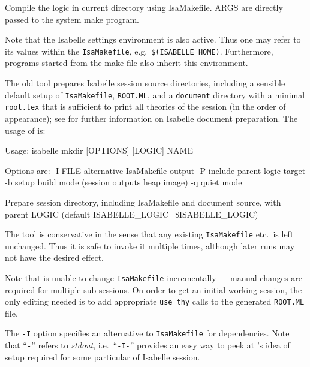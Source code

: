 \begin{isabellebody}
\begin{isamarkuptext}
\begin{ttbox}
  Compile the logic in current directory using IsaMakefile.
  ARGS are directly passed to the system make program.
\end{ttbox}

  Note that the Isabelle settings environment is also active. Thus one
  may refer to its values within the \verb|IsaMakefile|, e.g.\
  \verb|$(ISABELLE_HOME)|. Furthermore, programs started from
  the make file also inherit this environment.%
\end{isamarkuptext}%
\isamarkuptrue%
%
\isamarkuptrue%
%
\begin{isamarkuptext}%
The old \hypertarget{tool.mkdir}{\hyperlink{tool.mkdir}{\mbox{}}} tool prepares Isabelle session
  source directories, including a sensible default setup of \verb|IsaMakefile|, \verb|ROOT.ML|, and a \verb|document|
  directory with a minimal \verb|root.tex| that is sufficient to
  print all theories of the session (in the order of appearance); see
  \secref{sec:tool-document} for further information on Isabelle
  document preparation.  The usage of \hyperlink{tool.mkdir}{\mbox{}} is:

\begin{ttbox}
Usage: isabelle mkdir [OPTIONS] [LOGIC] NAME

  Options are:
    -I FILE      alternative IsaMakefile output
    -P           include parent logic target
    -b           setup build mode (session outputs heap image)
    -q           quiet mode

  Prepare session directory, including IsaMakefile and document source,
  with parent LOGIC (default ISABELLE_LOGIC=\$ISABELLE_LOGIC)
\end{ttbox}

  The \hyperlink{tool.mkdir}{\mbox{}} tool is conservative in the sense that any
  existing \verb|IsaMakefile| etc.\ is left unchanged.  Thus it
  is safe to invoke it multiple times, although later runs may not
  have the desired effect.

  Note that \hyperlink{tool.mkdir}{\mbox{}} is unable to change \verb|IsaMakefile|
  incrementally --- manual changes are required for multiple
  sub-sessions.  On order to get an initial working session, the only
  editing needed is to add appropriate \verb|use_thy| calls to the
  generated \verb|ROOT.ML| file.%
\end{isamarkuptext}%
\isamarkuptrue%
%
\isamarkuptrue%
%
\begin{isamarkuptext}%
The \verb|-I| option specifies an alternative to \verb|IsaMakefile| for dependencies.  Note that ``\verb|-|'' refers
  to \emph{stdout}, i.e.\ ``\verb|-I-|'' provides an easy way
  to peek at \hyperlink{tool.mkdir}{\mbox{}}'s idea of \hyperlink{tool.make}{\mbox{}} setup required for
  some particular of Isabelle session.


\end{isamarkuptext}
\end{isabellebody}
